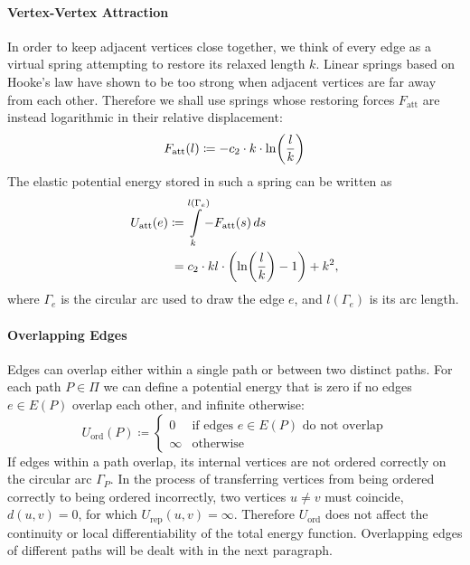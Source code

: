 \paragraph{Vertex-Vertex Attraction}

In order to keep adjacent vertices close together, we think of every edge as a virtual spring attempting to restore its relaxed length ${k}$. Linear springs based on Hooke's law have shown to be too strong when adjacent vertices are far away from each other. Therefore we shall use springs whose restoring forces ${F_\text{att}}$ are instead logarithmic in their relative displacement:
%
\begin{equation*}
  F_\text{att}(l) \coloneqq -c_2 \cdot k \cdot {\ln}{\left({\frac{l}{k}}\right)}
\end{equation*}
%
The elastic potential energy stored in such a spring can be written as
%
\begin{align*}
  U_\text{att}(e) \coloneqq{}& \int\limits_{k}^{\mathclap{l(\Gamma_e)}} -F_\text{att}(s) \differential{s}
  \\
  ={}& c_2 \cdot kl \cdot \left( \eval{\ln}{\frac{l}{k}} - 1 \right) + k^2,
\end{align*}
%
where ${\Gamma_e}$ is the circular arc used to draw the edge ${e}$, and ${l(\Gamma_e)}$ is its arc length.





\paragraph{Overlapping Edges}

Edges can overlap either within a single path or between two distinct paths. For each path ${P \in \Pi}$ we can define a potential energy that is zero if no edges ${e \in E(P)}$ overlap each other, and infinite otherwise:
%
\begin{equation*}
  U_\text{ord}(P) \coloneqq \begin{cases}
    0 & \text{if edges ${e \in E(P)}$ do not overlap}
    \\
    \infty & \text{otherwise}
  \end{cases}
\end{equation*}
%
If edges within a path overlap, its internal vertices are not ordered correctly on the circular arc ${\Gamma_P}$. In the process of transferring vertices from being ordered correctly to being ordered incorrectly, two vertices ${u \neq v}$ must coincide, \ie{} ${d(u,v) = 0}$, for which ${U_\text{rep}(u,v) = \infty}$. Therefore ${U_\text{ord}}$ does not affect the continuity or local differentiability of the total energy function. Overlapping edges of different paths will be dealt with in the next paragraph.





